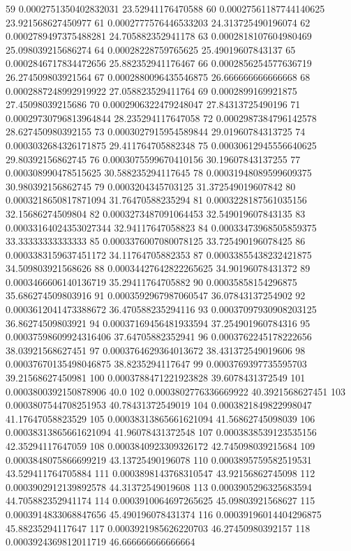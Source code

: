 {59 0.0002751350402832031 23.52941176470588
60 0.00027561187744140625 23.921568627450977
61 0.0002777576446533203 24.313725490196074
62 0.0002789497375488281 24.705882352941178
63 0.0002818107604980469 25.098039215686274
64 0.00028228759765625 25.49019607843137
65 0.0002846717834472656 25.882352941176467
66 0.0002856254577636719 26.274509803921564
67 0.0002880096435546875 26.666666666666668
68 0.0002887248992919922 27.058823529411764
69 0.0002899169921875 27.45098039215686
70 0.0002906322479248047 27.84313725490196
71 0.00029730796813964844 28.235294117647058
72 0.0002987384796142578 28.627450980392155
73 0.0003027915954589844 29.01960784313725
74 0.0003032684326171875 29.411764705882348
75 0.00030612945556640625 29.80392156862745
76 0.0003075599670410156 30.19607843137255
77 0.000308990478515625 30.588235294117645
78 0.00031948089599609375 30.980392156862745
79 0.0003204345703125 31.372549019607842
80 0.0003218650817871094 31.76470588235294
81 0.0003228187561035156 32.15686274509804
82 0.0003273487091064453 32.549019607843135
83 0.00033164024353027344 32.94117647058823
84 0.00033473968505859375 33.33333333333333
85 0.0003376007080078125 33.725490196078425
86 0.0003383159637451172 34.11764705882353
87 0.00033855438232421875 34.509803921568626
88 0.00034427642822265625 34.90196078431372
89 0.0003466606140136719 35.29411764705882
90 0.00035858154296875 35.686274509803916
91 0.0003592967987060547 36.07843137254902
92 0.0003612041473388672 36.470588235294116
93 0.00037097930908203125 36.86274509803921
94 0.00037169456481933594 37.254901960784316
95 0.00037598609924316406 37.64705882352941
96 0.0003762245178222656 38.03921568627451
97 0.0003764629364013672 38.431372549019606
98 0.00037670135498046875 38.8235294117647
99 0.0003769397735595703 39.21568627450981
100 0.0003788471221923828 39.6078431372549
101 0.0003800392150878906 40.0
102 0.0003802776336669922 40.3921568627451
103 0.0003807544708251953 40.78431372549019
104 0.0003821849822998047 41.17647058823529
105 0.00038313865661621094 41.56862745098039
106 0.00038313865661621094 41.96078431372548
107 0.0003838539123535156 42.35294117647059
108 0.0003840923309326172 42.745098039215684
109 0.0003848075866699219 43.13725490196078
110 0.0003895759582519531 43.529411764705884
111 0.0003898143768310547 43.92156862745098
112 0.0003902912139892578 44.31372549019608
113 0.0003905296325683594 44.705882352941174
114 0.0003910064697265625 45.09803921568627
115 0.0003914833068847656 45.490196078431374
116 0.00039196014404296875 45.88235294117647
117 0.0003921985626220703 46.27450980392157
118 0.0003924369812011719 46.666666666666664
}

